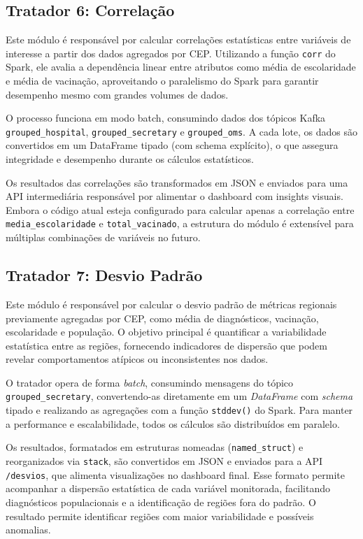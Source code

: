 \documentclass[a4paper,12pt]{article}
\begin{document}
\subsection{Tratador 6: Correlação}

Este módulo é responsável por calcular correlações estatísticas entre variáveis de interesse a partir dos dados agregados por CEP. Utilizando a função \texttt{corr} do Spark, ele avalia a dependência linear entre atributos como média de escolaridade e média de vacinação, aproveitando o paralelismo do Spark para garantir desempenho mesmo com grandes volumes de dados.

O processo funciona em modo batch, consumindo dados dos tópicos Kafka \\ \texttt{grouped\_hospital}, \texttt{grouped\_secretary} e \texttt{grouped\_oms}. A cada lote, os dados são convertidos em um DataFrame tipado (com schema explícito), o que assegura integridade e desempenho durante os cálculos estatísticos.

Os resultados das correlações são transformados em JSON e enviados para uma API intermediária responsável por alimentar o dashboard com insights visuais. Embora o código atual esteja configurado para calcular apenas a correlação entre \texttt{media\_escolaridade} e \texttt{total\_vacinado}, a estrutura do módulo é extensível para múltiplas combinações de variáveis no futuro.



\subsection{Tratador 7: Desvio Padrão}

Este módulo é responsável por calcular o desvio padrão de métricas regionais previamente agregadas por CEP, como média de diagnósticos, vacinação, escolaridade e população. O objetivo principal é quantificar a variabilidade estatística entre as regiões, fornecendo indicadores de dispersão que podem revelar comportamentos atípicos ou inconsistentes nos dados.

O tratador opera de forma \textit{batch}, consumindo mensagens do tópico  \\ \texttt{grouped\_secretary}, convertendo-as diretamente em um \textit{DataFrame} com \textit{schema} tipado e realizando as agregações com a função \texttt{stddev()} do Spark. Para manter a performance e escalabilidade, todos os cálculos são distribuídos em paralelo.

Os resultados, formatados em estruturas nomeadas (\texttt{named\_struct}) e reorganizados via \texttt{stack}, são convertidos em JSON e enviados para a API \texttt{/desvios}, que alimenta visualizações no dashboard final. Esse formato permite acompanhar a dispersão estatística de cada variável monitorada, facilitando diagnósticos populacionais e a identificação de regiões fora do padrão. O resultado permite identificar regiões com maior variabilidade e possíveis anomalias.
\end{document}

